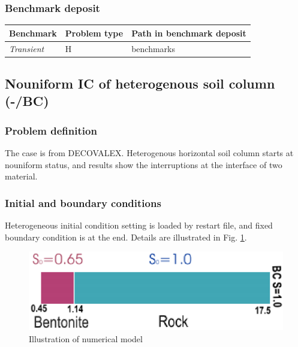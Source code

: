 \subsubsection*{Benchmark deposit}
\begin{tabular}{|l|l|l|}
  \hline
  Benchmark & Problem type & Path in benchmark deposit \\
  \hline
 \emph{Transient} & H & benchmarks\verb \h_us\wet\ \\
  \hline
\end{tabular}
%

\subsection{Nouniform IC of heterogenous soil column (-/BC)}
%
\subsubsection*{Problem definition}
The case is from DECOVALEX.  Heterogenous horizontal soil column
starts at nouniform status, and results show the interruptions at
the interface of two material.
%
\subsubsection*{Initial and boundary conditions}
Heterogeneous initial condition setting is loaded by restart file,
and fixed boundary condition is at the end. Details are
illustrated in Fig. \ref{us:DECO}.
\begin{figure} [h]
 \centering
 \includegraphics[width=0.45\columnwidth] {H_US/figures/illustration_DECO.eps}
 \caption{Illustration of numerical model}
 \label{us:DECO}
\end{figure}
